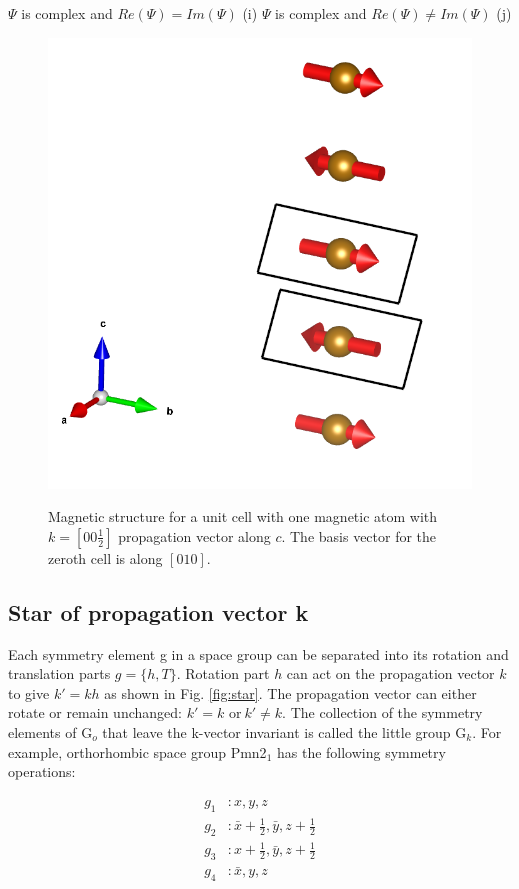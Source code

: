 \documentclass[letterpaper,10pt,doublespacing,edeposit]{uiucthesis2020}
\begin{document}
\begin{mainmatter}
$\Psi$  is complex and $Re(\Psi) = Im(\Psi)$ (i)
$\Psi$ is complex and $Re(\Psi) \neq Im(\Psi)$ (j)
\fi


\begin{figure}
\centering\includegraphics[width=0.5\columnwidth]{figures/ch4/propagation_vector_vesta.png} \\
\caption{\label{fig:propagation_vector}
Magnetic structure for a unit cell with one magnetic atom with $k = [00\frac{1}{2}]$ propagation vector along $c$. The basis vector for the zeroth cell is  along $[010]$.
}
\end{figure}


\subsection{Star of propagation vector k}


Each symmetry element g in a space group can be separated into its rotation and translation parts $g = \{h,T\}$. Rotation part $h$ can act on the propagation vector $k$ to give $k' = kh$ as shown in Fig. \ref{fig:star}. The propagation vector can either rotate or remain unchanged: $k' = k \text{ or}\ k' \neq k$. The collection of the symmetry elements of G$_o$ that leave the k-vector invariant is called the little group G$_k$. For example, orthorhombic space group Pmn2$_1$ has the following symmetry operations:

\begin{align*}
g_1 &: x,y,z\\
g_2 &: \bar{x}+\frac{1}{2},\bar{y}, z+\frac{1}{2}\\
g_3 &: x+\frac{1}{2},\bar{y}, z+\frac{1}{2}\\
g_4 &: \bar{x},y,z
\end{align*}


\end{mainmatter}
\end{document}
